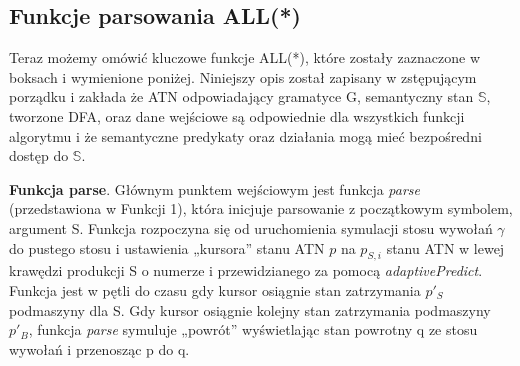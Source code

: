 ﻿\subsection{Funkcje parsowania ALL(*)}
Teraz możemy omówić kluczowe funkcje ALL(*), które zostały zaznaczone w boksach
i wymienione poniżej. Niniejszy opis został zapisany w zstępującym porządku i zakłada
że ATN odpowiadający gramatyce G, semantyczny stan $\mathbb{S}$, tworzone DFA, oraz dane wejściowe
są odpowiednie dla wszystkich funkcji algorytmu i że semantyczne predykaty oraz działania
mogą mieć bezpośredni dostęp do $\mathbb{S}$.
\par
\textbf{Funkcja parse}. Głównym punktem wejściowym jest funkcja \textit{parse}
(przedstawiona w Funkcji 1), która inicjuje parsowanie z początkowym symbolem, argument S.
Funkcja rozpoczyna się od uruchomienia symulacji stosu wywołań $\gamma$ do pustego stosu
i ustawienia „kursora” stanu ATN $p$ na $p_{S,i}$ stanu ATN w lewej krawędzi produkcji S
o numerze i przewidzianego za pomocą \textit{adaptivePredict}.
Funkcja jest w pętli do czasu gdy kursor osiągnie stan zatrzymania $p'_S$ podmaszyny dla S.
Gdy kursor osiągnie kolejny stan zatrzymania podmaszyny $p'_B$, funkcja \textit{parse}
symuluje „powrót” wyświetlając stan powrotny q ze stosu wywołań i przenosząc p do q.
\\
